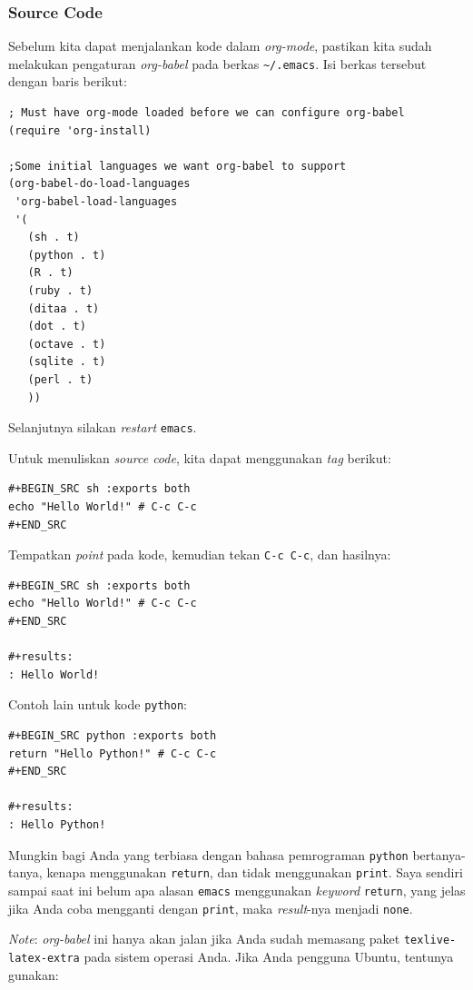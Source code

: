 \documentclass{article}
\begin{document}
\subsubsection{Source Code}
Sebelum kita dapat menjalankan kode dalam \emph{org-mode}, pastikan kita
sudah melakukan pengaturan \emph{org-babel} pada berkas \verb=~/.emacs=.
Isi berkas tersebut dengan baris berikut:

\begin{verbatim}
; Must have org-mode loaded before we can configure org-babel
(require 'org-install)

;Some initial languages we want org-babel to support
(org-babel-do-load-languages
 'org-babel-load-languages
 '(
   (sh . t)
   (python . t)
   (R . t)
   (ruby . t)
   (ditaa . t)
   (dot . t)
   (octave . t)
   (sqlite . t)
   (perl . t)
   ))
\end{verbatim}

Selanjutnya silakan \emph{restart} \verb=emacs=.

Untuk menuliskan \emph{source code}, kita dapat menggunakan \emph{tag} berikut:

\begin{verbatim}
#+BEGIN_SRC sh :exports both
echo "Hello World!" # C-c C-c
#+END_SRC
\end{verbatim}

Tempatkan \emph{point} pada kode, kemudian tekan \verb=C-c C-c=, dan hasilnya:

\begin{verbatim}
#+BEGIN_SRC sh :exports both
echo "Hello World!" # C-c C-c
#+END_SRC

#+results:
: Hello World!
\end{verbatim}

Contoh lain untuk kode \verb=python=:

\begin{verbatim}
#+BEGIN_SRC python :exports both
return "Hello Python!" # C-c C-c
#+END_SRC

#+results:
: Hello Python!
\end{verbatim}

Mungkin bagi Anda yang terbiasa dengan bahasa pemrograman \verb=python= 
bertanya-tanya, kenapa menggunakan \verb=return=, dan tidak menggunakan
\verb=print=. Saya sendiri sampai saat ini belum apa alasan \verb=emacs=
menggunakan \emph{keyword} \verb=return=, yang jelas jika Anda coba 
mengganti dengan \verb=print=, maka \emph{result}-nya menjadi
\verb=none=.

\emph{Note}: \emph{org-babel} ini hanya akan jalan jika Anda sudah 
memasang paket \verb=texlive-latex-extra= pada sistem operasi Anda. Jika
Anda pengguna Ubuntu, tentunya gunakan:
\end{document}
